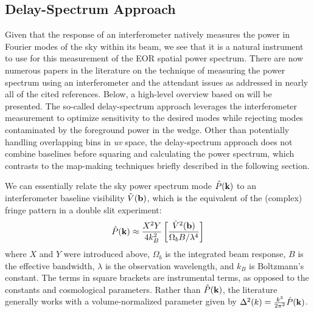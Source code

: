 \documentclass[preprint,11pt]{aastex}
\newcommand{\kvec}{{\bf k}}
\newcommand{\bvec}{{\bf b}}
\begin{document}
\subsection{Delay-Spectrum Approach}
\label{sec:delayapproach}
Given that the response of an interferometer natively measures the power in Fourier modes of the sky within its beam, we see that it is a natural instrument to use for this measurement of the EOR spatial power spectrum.  There are now numerous papers in the literature on the technique of measuring the power spectrum using an interferometer and the attendant issues as addressed in nearly all of the cited references.  Below, a high-level overview based on  \cite{parsons_et_al2012b} will be presented. The so-called delay-spectrum approach leverages the interferometer measurement to optimize sensitivity to the desired modes while rejecting modes contaminated by the foreground power in the wedge.  Other than potentially handling overlapping bins in {\em uv} space, the delay-spectrum approach does not combine baselines before squaring and calculating the power spectrum, which contrasts to the map-making techniques briefly described in the following section.

We can essentially relate the sky power spectrum mode ${\hat P}(\kvec)$ to an interferometer baseline visibility ${\tilde V}(\bvec)$, which is the equivalent of the (complex) fringe pattern in a double slit experiment:
\begin{equation}
{\hat P}(\kvec) \approx\frac{X^2Y}{4k_B^2}   \left[\frac{{\tilde V}^2(\bvec)}{\Omega_b B/ \lambda^4} \right]
\label{eq:Pk_baseline}
\end{equation}
where $X$ and $Y$ were introduced above, $\Omega_b$ is the integrated beam response, $B$ is the effective bandwidth, $\lambda$ is the observation wavelength, and $k_B$ is Boltzmann's constant.  The terms in square brackets are instrumental terms, as opposed to the constants and cosmological parameters.  
Rather than ${\hat P}(\kvec)$, the literature generally works with a volume-normalized parameter given by $\Delta^2(k) = \frac{k^3}{2\pi^2}{\hat P}(\kvec)$.    
\end{document}
